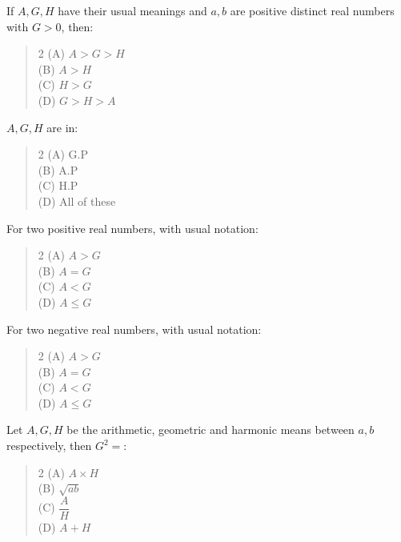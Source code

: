 \documentclass[11pt,a4paper]{article}
\begin{document}
\begin{mcqlist}
\item If $A,G,H$ have their usual meanings and $a,b$ are positive distinct real numbers with $G>0$, then:
\begin{quote}\begin{multicols}{2}
\noindent (A) $A>G>H$ \\
(B) $A>H$ \\
(C) $H>G$ \\
(D) $G>H>A$
\end{multicols}\end{quote}

\item $A,G,H$ are in:
\begin{quote}\begin{multicols}{2}
\noindent (A) G.P \\
(B) A.P \\
(C) H.P \\
(D) All of these
\end{multicols}\end{quote}

\item For two positive real numbers, with usual notation:
\begin{quote}\begin{multicols}{2}
\noindent (A) $A>G$ \\
(B) $A=G$ \\
(C) $A<G$ \\
(D) $A\leq G$
\end{multicols}\end{quote}

\item For two negative real numbers, with usual notation:
\begin{quote}\begin{multicols}{2}
\noindent (A) $A>G$ \\
(B) $A=G$ \\
(C) $A<G$ \\
(D) $A\leq G$
\end{multicols}\end{quote}

\item Let $A,G,H$ be the arithmetic, geometric and harmonic means between $a,b$ respectively, then $G^2=$:
\begin{quote}\begin{multicols}{2}
\noindent (A) $A\times H$ \\
(B) $\sqrt{ab}$ \\
(C) $\dfrac{A}{H}$ \\
(D) $A+H$
\end{multicols}\end{quote}


\end{mcqlist}
\end{document}
